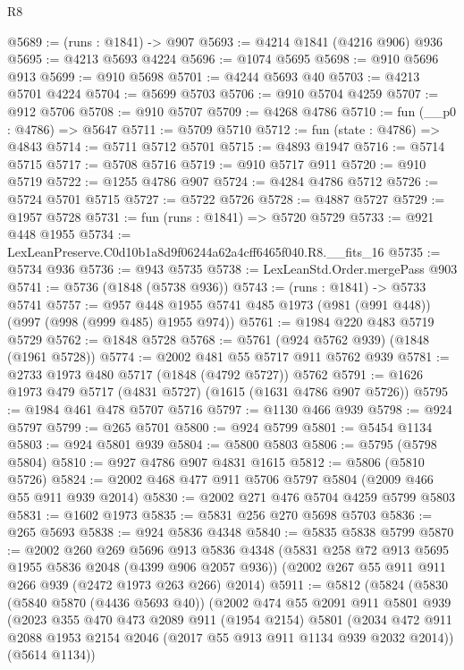 \begin{lexlean}{R8}
\begin{coremodule}
@5689 := (runs : @1841) -> @907
@5693 := @4214 @1841 (@4216 @906) @936
@5695 := @4213 @5693 @4224
@5696 := @1074 @5695
@5698 := @910 @5696 @913
@5699 := @910 @5698
@5701 := @4244 @5693 @40
@5703 := @4213 @5701 @4224
@5704 := @5699 @5703
@5706 := @910 @5704 @4259
@5707 := @912 @5706
@5708 := @910 @5707
@5709 := @4268 @4786
@5710 := fun (__p0 : @4786) => @5647
@5711 := @5709 @5710
@5712 := fun (state : @4786) => @4843
@5714 := @5711 @5712 @5701
@5715 := @4893 @1947
@5716 := @5714 @5715
@5717 := @5708 @5716
@5719 := @910 @5717 @911
@5720 := @910 @5719
@5722 := @1255 @4786 @907
@5724 := @4284 @4786 @5712
@5726 := @5724 @5701 @5715
@5727 := @5722 @5726
@5728 := @4887 @5727
@5729 := @1957 @5728
@5731 := fun (runs : @1841) => @5720 @5729
@5733 := @921 @448 @1955
@5734 := LexLeanPreserve.C0d10b1a8d9f06244a62a4cff6465f040.R8.__fits_16
@5735 := @5734 @936
@5736 := @943 @5735
@5738 := LexLeanStd.Order.mergePass @903
@5741 := @5736 (@1848 (@5738 @936))
@5743 := (runs : @1841) -> @5733 @5741
@5757 := @957 @448 @1955 @5741 @485 @1973 (@981 (@991 @448)) (@997 (@998 (@999 @485) @1955 @974))
@5761 := @1984 @220 @483 @5719 @5729
@5762 := @1848 @5728
@5768 := @5761 (@924 @5762 @939) (@1848 (@1961 @5728))
@5774 := @2002 @481 @55 @5717 @911 @5762 @939
@5781 := @2733 @1973 @480 @5717 (@1848 (@4792 @5727)) @5762
@5791 := @1626 @1973 @479 @5717 (@4831 @5727) (@1615 (@1631 @4786 @907 @5726))
@5795 := @1984 @461 @478 @5707 @5716
@5797 := @1130 @466 @939
@5798 := @924 @5797
@5799 := @265 @5701
@5800 := @924 @5799
@5801 := @5454 @1134
@5803 := @924 @5801 @939
@5804 := @5800 @5803
@5806 := @5795 (@5798 @5804)
@5810 := @927 @4786 @907 @4831 @1615
@5812 := @5806 (@5810 @5726)
@5824 := @2002 @468 @477 @911 @5706 @5797 @5804 (@2009 @466 @55 @911 @939 @2014)
@5830 := @2002 @271 @476 @5704 @4259 @5799 @5803
@5831 := @1602 @1973
@5835 := @5831 @256 @270 @5698 @5703
@5836 := @265 @5693
@5838 := @924 @5836 @4348
@5840 := @5835 @5838 @5799
@5870 := @2002
    @260
    @269
    @5696
    @913
    @5836
    @4348
    (@5831 @258 @72 @913 @5695 @1955 @5836 @2048 (@4399 @906 @2057 @936))
    (@2002 @267 @55 @911 @911 @266 @939 (@2472 @1973 @263 @266) @2014)
@5911 := @5812
    (@5824
      (@5830
        (@5840 @5870 (@4436 @5693 @40))
        (@2002
          @474
          @55
          @2091
          @911
          @5801
          @939
          (@2023
            @355
            @470
            @473
            @2089
            @911
            (@1954 @2154)
            @5801
            (@2034 @472 @911 @2088 @1953 @2154 @2046 (@2017 @55 @913 @911 @1134 @939 @2032 @2014))
            (@5614 @1134))

\end{coremodule}
\end{lexlean}
